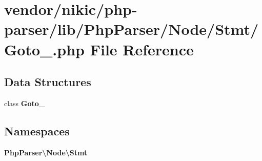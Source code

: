 \section{vendor/nikic/php-\/parser/lib/\+Php\+Parser/\+Node/\+Stmt/\+Goto\+\_\+.php File Reference}
\label{_goto___8php}
\subsection*{Data Structures}
\begin{DoxyCompactItemize}
\item 
class {\bf Goto\+\_\+}
\end{DoxyCompactItemize}
\subsection*{Namespaces}
\begin{DoxyCompactItemize}
\item 
 {\bf Php\+Parser\textbackslash{}\+Node\textbackslash{}\+Stmt}
\end{DoxyCompactItemize}
